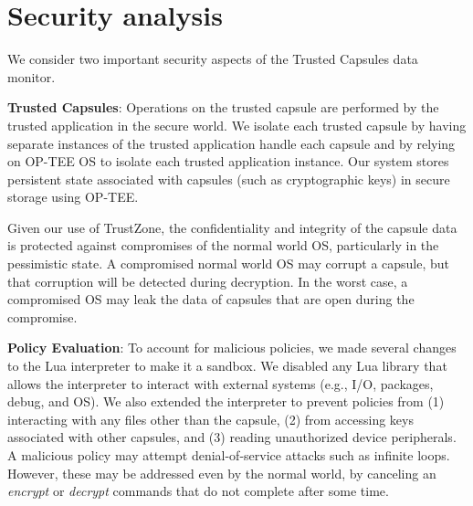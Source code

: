 
\section{Security analysis}

We consider two important security aspects of the Trusted Capsules data monitor.

\textbf{Trusted Capsules}: Operations on the trusted capsule are performed by
the trusted application in the secure world. We isolate each trusted capsule by
having separate instances of the trusted application handle each capsule and
by relying on OP-TEE OS to isolate each trusted application instance.
Our system stores persistent state associated with capsules (such as cryptographic keys)
in secure storage using OP-TEE.

Given our use of TrustZone, the confidentiality and integrity of the capsule
data is protected against compromises of the normal world OS, particularly in
the pessimistic state. A compromised normal world OS may corrupt a capsule, but
that corruption will be detected during decryption. In the worst case, a compromised OS
may leak the data of capsules that are open during the compromise.

\textbf{Policy Evaluation}: To account for malicious policies, we made several
changes to the Lua interpreter to make it a sandbox. We disabled any Lua library
that allows the interpreter to interact with external systems (e.g., I/O,
packages, debug, and OS). We also extended the interpreter to prevent policies
from (1) interacting with any files other than the capsule, (2) from accessing
keys associated with other capsules, and (3) reading unauthorized device
peripherals. A malicious policy may attempt denial-of-service attacks such as
infinite loops. However, these may be addressed even by the normal world, by
canceling an {\em encrypt} or {\em decrypt} commands that do not complete after
some time.
